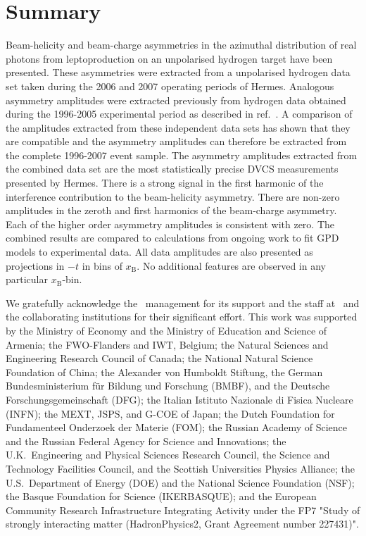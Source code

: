 \section{Summary}


Beam-helicity and beam-charge asymmetries in the azimuthal distribution of real photons from leptoproduction on an unpolarised hydrogen target have been presented. These asymmetries were extracted from a unpolarised hydrogen data set taken during the 2006 and 2007 operating periods of H{\sc ermes}. Analogous asymmetry amplitudes were extracted previously from hydrogen data obtained during the 1996-2005 experimental period as described in ref.~\cite{Air09}. A comparison of the amplitudes extracted from these independent data sets has shown that they are compatible and the asymmetry amplitudes can therefore be extracted from the complete 1996-2007 event sample. The asymmetry amplitudes extracted from the combined data set are the most statistically precise DVCS measurements presented by H{\sc ermes}. There is a strong signal in the first harmonic of the interference contribution to the beam-helicity asymmetry. There are non-zero amplitudes in the zeroth and first harmonics of the beam-charge asymmetry. Each of the higher order asymmetry amplitudes is consistent with zero. The combined results are compared to calculations from ongoing work to fit GPD models to experimental data. All data amplitudes are also presented as projections in $-t$ in bins of $x_{\textrm{B}}$. No additional features are observed in any particular $x_{\textrm{B}}$-bin.

\acknowledgments

We gratefully acknowledge the \desy\ management for its support and the staff
at \desy\ and the collaborating institutions for their significant effort.
This work was supported by 
the Ministry of Economy and the Ministry of Education and Science of Armenia;
the FWO-Flanders and IWT, Belgium;
the Natural Sciences and Engineering Research Council of Canada;
the National Natural Science Foundation of China;
the Alexander von Humboldt Stiftung,
the German Bundesministerium f\"ur Bildung und Forschung (BMBF), and
the Deutsche Forschungsgemeinschaft (DFG);
the Italian Istituto Nazionale di Fisica Nucleare (INFN);
the MEXT, JSPS, and G-COE of Japan;
the Dutch Foundation for Fundamenteel Onderzoek der Materie (FOM);
the Russian Academy of Science and the Russian Federal Agency for 
Science and Innovations;
the U.K.~Engineering and Physical Sciences Research Council, 
the Science and Technology Facilities Council,
and the Scottish Universities Physics Alliance;
the U.S.~Department of Energy (DOE) and the National Science Foundation (NSF);
the Basque Foundation for Science (IKERBASQUE);
and the European Community Research Infrastructure Integrating Activity
under the FP7 "Study of strongly interacting matter (HadronPhysics2, Grant
Agreement number 227431)".



